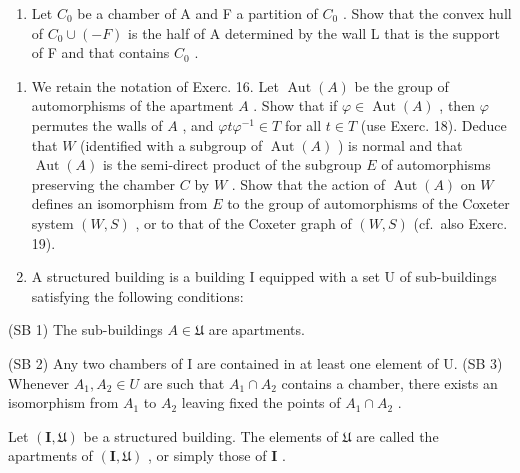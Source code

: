 \begin{enumerate}
\def\labelenumi{\alph{enumi})}
\setcounter{enumi}{3}
\tightlist
\item
  Let \(C_{0}\) be a chamber of A and F a partition of \(C_{0}\) . Show that the convex hull of \(C_{0} \cup (-F)\) is the half of A determined by the wall L that is the support of F and that contains \(C_{0}\) .
\end{enumerate}

\begin{enumerate}
\def\labelenumi{\arabic{enumi})}
\setcounter{enumi}{22}
\item
  We retain the notation of Exerc. 16. Let \(\operatorname{Aut}(A)\) be the group of automorphisms of the apartment \(A\) . Show that if \(\varphi \in \operatorname{Aut}(A)\) , then \(\varphi\) permutes the walls of \(A\) , and \(\varphi t\varphi^{-1} \in T\) for all \(t \in T\) (use Exerc. 18). Deduce that \(W\) (identified with a subgroup of \(\operatorname{Aut}(A)\) ) is normal and that \(\operatorname{Aut}(A)\) is the semi-direct product of the subgroup \(E\) of automorphisms preserving the chamber \(C\) by \(W\) . Show that the action of \(\operatorname{Aut}(A)\) on \(W\) defines an isomorphism from \(E\) to the group of automorphisms of the Coxeter system \((W, S)\) , or to that of the Coxeter graph of \((W, S)\) (cf.~also Exerc. 19).
\item
  A structured building is a building I equipped with a set U of sub-buildings satisfying the following conditions:
\end{enumerate}

(SB 1) The sub-buildings \(A \in \mathfrak{U}\) are apartments.

(SB 2) Any two chambers of I are contained in at least one element of U. (SB 3) Whenever \(A_{1}, A_{2} \in U\) are such that \(A_{1} \cap A_{2}\) contains a chamber, there exists an isomorphism from \(A_{1}\) to \(A_{2}\) leaving fixed the points of \(A_{1} \cap A_{2}\) .

Let \((\mathbf{I},\mathfrak{U})\) be a structured building. The elements of \(\mathfrak{U}\) are called the apartments of \((\mathbf{I},\mathfrak{U})\) , or simply those of \(\mathbf{I}\) .

